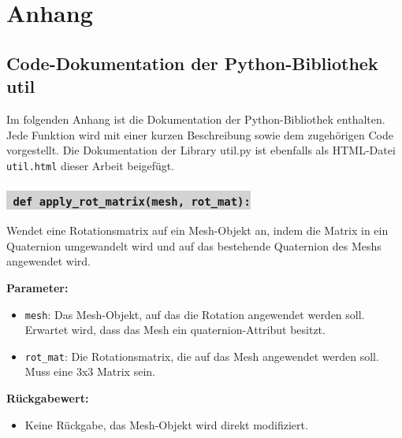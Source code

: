 

\section{Anhang}

\subsection{Code-Dokumentation der Python-Bibliothek util}

Im folgenden Anhang ist die Dokumentation der Python-Bibliothek enthalten. Jede Funktion wird mit einer kurzen Beschreibung sowie dem zugehörigen Code vorgestellt.
Die Dokumentation der Library util.py ist ebenfalls als HTML-Datei \texttt{util.html} dieser Arbeit beigefügt.










\subsubsection*{\colorbox{lightgray}{\texttt{\textbf{\color{green} def} \color{blue} apply\_rot\_matrix}\textbf{\texttt{(mesh, rot\_mat):}}}}
Wendet eine Rotationsmatrix auf ein Mesh-Objekt an, indem die Matrix in ein Quaternion umgewandelt wird und auf das bestehende Quaternion des Meshs angewendet wird.

\noindent \textbf{Parameter:} \vspace{-6ex} \\
\begin{itemize}
    \setlength{\itemindent}{1em}
    \item \texttt{mesh}: Das Mesh-Objekt, auf das die Rotation angewendet werden soll. Erwartet wird, dass das Mesh ein quaternion-Attribut besitzt.
    \item \texttt{rot\_mat}: Die Rotationsmatrix, die auf das Mesh angewendet werden soll. Muss eine 3x3 Matrix sein.
\end{itemize}

\noindent \textbf{Rückgabewert:} \vspace{-6ex} \\
\begin{itemize}
    \setlength{\itemindent}{1em}
    \item Keine Rückgabe, das Mesh-Objekt wird direkt modifiziert.
\end{itemize}

